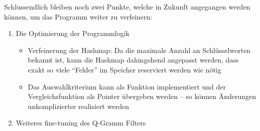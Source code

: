 Schlussendlich bleiben noch zwei Punkte, welche in Zukunft angegangen werden können, um das Programm weiter zu verfeinern:
\begin{enumerate}

\item Die Optimierung der Programmlogik \\
    \begin{itemize}
        \item Verfeinerung der Hashmap: Da die maximale Anzahl an Schlüsselworten bekannt ist, kann die Hashmap dahingehend angepasst werden, dass exakt so viele "`Felder"' im Speicher reserviert werden wie nötig
        \item Das Auswahlkriterium kann als Funktion implementiert und der Vergleichsfunktion als Pointer übergeben werden -- so können Änderungen unkomplizierter realisiert werden
    \end{itemize}


\item Weiteres fine-tuning des Q-Gramm Filters


\end{enumerate}



